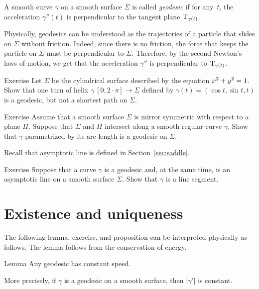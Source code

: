A smooth curve $\gamma$ on a smooth surface $\Sigma$ is called \emph{geodesic} if for any~$t$, the acceleration $\gamma''(t)$ is perpendicular to the tangent plane $\mathrm{T}_{\gamma(t)}$.

Physically, geodesics can be understood as the trajectories of a particle that slides on $\Sigma$ without friction.
Indeed, since there is no friction, the force that keeps the particle on $\Sigma$ must be perpendicular to $\Sigma$.
Therefore, by the second Newton's laws of motion,
we get that the acceleration $\gamma''$ is perpendicular to $\mathrm{T}_{\gamma(t)}$.

\begin{thm}{Exercise}\label{ex:helix=geodesic}
Let $\Sigma$ be the cylindrical surface described by the equation $x^2\z+y^2=1$.
Show that one turn of helix $\gamma\:[0,2\cdot\pi]\to \Sigma$ defined by $\gamma(t)=(\cos t,\sin t, t)$
is a geodesic, but not a shortest path on $\Sigma$.
\end{thm}

\begin{thm}{Exercise}\label{ex:reflection-geodesic}
Assume that a smooth surface $\Sigma$ is mirror symmetric with respect to  a plane $\Pi$.
Suppose that $\Sigma$ and $\Pi$ intersect along a smooth regular curve $\gamma$.
Show that $\gamma$ parametrized by its arc-length is a geodesic on $\Sigma$.
\end{thm}

Recall that asymptotic line is defined in Section~\ref{sec:saddle}.

\begin{thm}{Exercise}\label{ex:asymptotic-geodesic}
Suppose that a curve $\gamma$ is a geodesic and, at the same time, is an asymptotic line on a smooth surface $\Sigma$.
Show that $\gamma$ is a line segment.
\end{thm}

\section{Existence and uniqueness}

The following lemma, exercise, and proposition can be interpreted physically as follows.
The lemma follows from the conservation of energy.

\begin{thm}{Lemma}\label{lem:constant-speed}
Any geodesic has constant speed.

More precisely, if $\gamma$ is a geodesic on a smooth surface, then $|\gamma'|$ is constant.
\end{thm}

